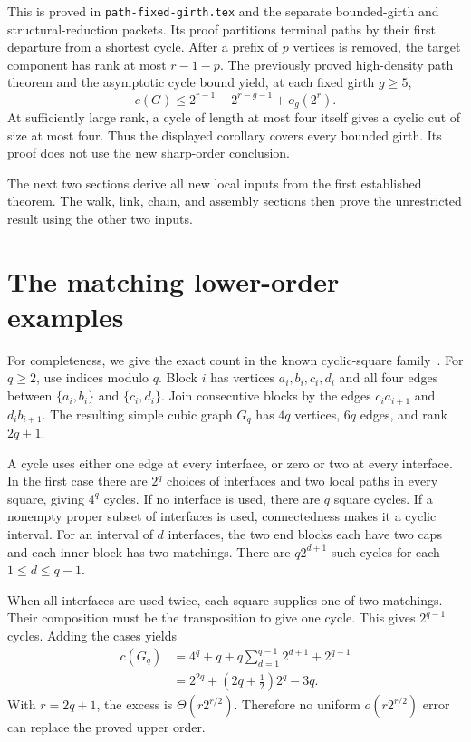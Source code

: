 \documentclass[11pt]{article}
\begin{document}
This is proved in \nolinkurl{path-fixed-girth.tex} and the separate bounded-girth and structural-reduction packets.
Its proof partitions terminal paths by their first departure from a shortest cycle.
After a prefix of $p$ vertices is removed, the target component has rank at most $r-1-p$.
The previously proved high-density path theorem and the asymptotic cycle bound yield, at each fixed girth $g\ge5$,
\[
 c(G)\le2^{r-1}-2^{r-g-1}+o_g(2^r).
\]
At sufficiently large rank, a cycle of length at most four itself gives a cyclic cut of size at most four.
Thus the displayed corollary covers every bounded girth.
Its proof does not use the new sharp-order conclusion.

The next two sections derive all new local inputs from the first established theorem.
The walk, link, chain, and assembly sections then prove the unrestricted result using the other two inputs.







\section{The matching lower-order examples}
For completeness, we give the exact count in the known cyclic-square family~\cite{HK}.
For $q\ge2$, use indices modulo $q$.
Block $i$ has vertices $a_i,b_i,c_i,d_i$ and all four edges between $\{a_i,b_i\}$ and $\{c_i,d_i\}$.
Join consecutive blocks by the edges $c_i a_{i+1}$ and $d_i b_{i+1}$.
The resulting simple cubic graph $G_q$ has $4q$ vertices, $6q$ edges, and rank $2q+1$.

A cycle uses either one edge at every interface, or zero or two at every interface.
In the first case there are $2^q$ choices of interfaces and two local paths in every square, giving $4^q$ cycles.
If no interface is used, there are $q$ square cycles.
If a nonempty proper subset of interfaces is used, connectedness makes it a cyclic interval.
For an interval of $d$ interfaces, the two end blocks each have two caps and each inner block has two matchings.
There are $q2^{d+1}$ such cycles for each $1\le d\le q-1$.

When all interfaces are used twice, each square supplies one of two matchings.
Their composition must be the transposition to give one cycle.
This gives $2^{q-1}$ cycles.
Adding the cases yields
\[
 \begin{aligned}
 c(G_q)
 &=4^q+q+q\sum_{d=1}^{q-1}2^{d+1}+2^{q-1}\\
 &=2^{2q}+\left(2q+\frac12\right)2^q-3q.
 \end{aligned}
\]
With $r=2q+1$, the excess is $\Theta(r2^{r/2})$.
Therefore no uniform $o(r2^{r/2})$ error can replace the proved upper order.
\end{document}
